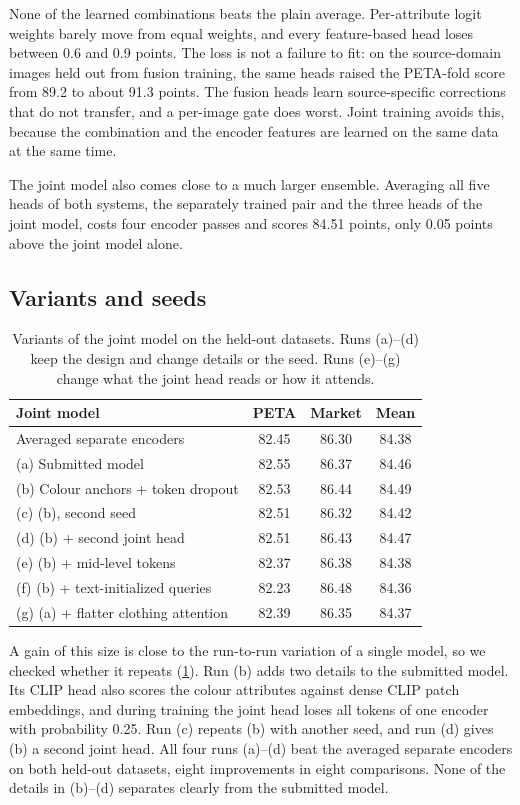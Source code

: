 \documentclass[10pt,twocolumn,letterpaper]{article}
\begin{document}
None of the learned combinations beats the plain average. Per-attribute logit weights barely move from equal weights, and every feature-based head loses between 0.6 and 0.9 points. The loss is not a failure to fit: on the source-domain images held out from fusion training, the same heads raised the PETA-fold score from 89.2 to about 91.3 points. The fusion heads learn source-specific corrections that do not transfer, and a per-image gate does worst. Joint training avoids this, because the combination and the encoder features are learned on the same data at the same time.

The joint model also comes close to a much larger ensemble. Averaging all five heads of both systems, the separately trained pair and the three heads of the joint model, costs four encoder passes and scores 84.51 points, only 0.05 points above the joint model alone.

\subsection{Variants and seeds}
\label{sec:variants}

\begin{table}[t]
\centering
\small
\setlength{\tabcolsep}{4pt}
\begin{tabular}{@{}lccc@{}}
\toprule
Joint model & PETA & Market & Mean \\
\midrule
Averaged separate encoders & 82.45 & 86.30 & 84.38 \\
\midrule
(a) Submitted model & 82.55 & 86.37 & 84.46 \\
(b) Colour anchors + token dropout & 82.53 & 86.44 & 84.49 \\
(c) (b), second seed & 82.51 & 86.32 & 84.42 \\
(d) (b) + second joint head & 82.51 & 86.43 & 84.47 \\
\midrule
(e) (b) + mid-level tokens & 82.37 & 86.38 & 84.38 \\
(f) (b) + text-initialized queries & 82.23 & 86.48 & 84.36 \\
(g) (a) + flatter clothing attention & 82.39 & 86.35 & 84.37 \\
\bottomrule
\end{tabular}
\caption{Variants of the joint model on the held-out datasets. Runs (a)--(d) keep the design and change details or the seed. Runs (e)--(g) change what the joint head reads or how it attends.}
\label{tab:var}
\end{table}

A gain of this size is close to the run-to-run variation of a single model, so we checked whether it repeats (\cref{tab:var}). Run (b) adds two details to the submitted model. Its CLIP head also scores the colour attributes against dense CLIP patch embeddings, and during training the joint head loses all tokens of one encoder with probability 0.25. Run (c) repeats (b) with another seed, and run (d) gives (b) a second joint head. All four runs (a)--(d) beat the averaged separate encoders on both held-out datasets, eight improvements in eight comparisons. None of the details in (b)--(d) separates clearly from the submitted model.
\end{document}
